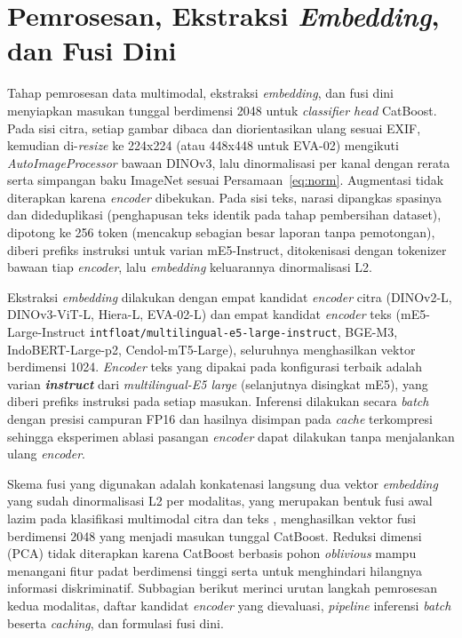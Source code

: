 \section{Pemrosesan, Ekstraksi \textit{Embedding}, dan Fusi Dini}
\label{sec:preprocessing}

Tahap pemrosesan data multimodal, ekstraksi \textit{embedding}, dan fusi dini menyiapkan masukan tunggal berdimensi 2048 untuk \textit{classifier head} CatBoost. Pada sisi citra, setiap gambar dibaca dan diorientasikan ulang sesuai EXIF, kemudian di-\textit{resize} ke 224x224 (atau 448x448 untuk EVA-02) mengikuti \textit{AutoImageProcessor} bawaan DINOv3, lalu dinormalisasi per kanal dengan rerata serta simpangan baku ImageNet sesuai Persamaan~\ref{eq:norm}. Augmentasi tidak diterapkan karena \textit{encoder} dibekukan. Pada sisi teks, narasi dipangkas spasinya dan dideduplikasi (penghapusan teks identik pada tahap pembersihan dataset), dipotong ke 256 token (mencakup sebagian besar laporan tanpa pemotongan), diberi prefiks instruksi untuk varian mE5-Instruct, ditokenisasi dengan tokenizer bawaan tiap \textit{encoder}, lalu \textit{embedding} keluarannya dinormalisasi L2.

Ekstraksi \textit{embedding} dilakukan dengan empat kandidat \textit{encoder} citra (DINOv2-L, DINOv3-ViT-L, Hiera-L, EVA-02-L) dan empat kandidat \textit{encoder} teks (mE5-Large-Instruct \texttt{intfloat/multilingual-e5-large-instruct}, BGE-M3, IndoBERT-Large-p2, Cendol-mT5-Large), seluruhnya menghasilkan vektor berdimensi 1024. \textit{Encoder} teks yang dipakai pada konfigurasi terbaik adalah varian \textbf{\textit{instruct}} dari \textit{multilingual-E5 large} (selanjutnya disingkat mE5), yang diberi prefiks instruksi pada setiap masukan. Inferensi dilakukan secara \textit{batch} dengan presisi campuran FP16 dan hasilnya disimpan pada \textit{cache} terkompresi sehingga eksperimen ablasi pasangan \textit{encoder} dapat dilakukan tanpa menjalankan ulang \textit{encoder}.

Skema fusi yang digunakan adalah konkatenasi langsung dua vektor \textit{embedding} yang sudah dinormalisasi L2 per modalitas, yang merupakan bentuk fusi awal lazim pada klasifikasi multimodal citra dan teks \citep{baltrusaitisMultimodalSurvey2019,audebertMultimodalDoc2019}, menghasilkan vektor fusi berdimensi 2048 yang menjadi masukan tunggal CatBoost. Reduksi dimensi (PCA) tidak diterapkan karena CatBoost berbasis pohon \textit{oblivious} mampu menangani fitur padat berdimensi tinggi serta untuk menghindari hilangnya informasi diskriminatif. Subbagian berikut merinci urutan langkah pemrosesan kedua modalitas, daftar kandidat \textit{encoder} yang dievaluasi, \textit{pipeline} inferensi \textit{batch} beserta \textit{caching}, dan formulasi fusi dini.

